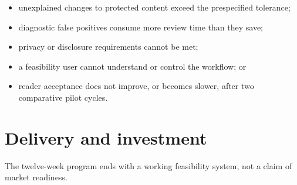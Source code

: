 \documentclass[
  11pt,
  english,
]{article}
\providecommand{\tightlist}{%
  \setlength{\itemsep}{0pt}\setlength{\parskip}{0pt}}
\begin{document}
\begin{itemize}
\tightlist
\item
  unexplained changes to protected content exceed the prespecified
  tolerance;
\item
  diagnostic false positives consume more review time than they save;
\item
  privacy or disclosure requirements cannot be met;
\item
  a feasibility user cannot understand or control the workflow; or
\item
  reader acceptance does not improve, or becomes slower, after two
  comparative pilot cycles.
\end{itemize}

\hypertarget{delivery-and-investment}{%
\section{Delivery and investment}\label{delivery-and-investment}}

The twelve-week program ends with a working feasibility system, not a
claim of market readiness.
\end{document}
